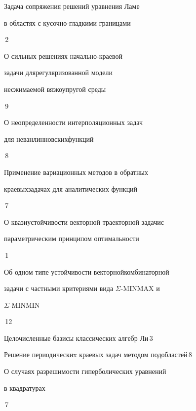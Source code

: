 

{Задача сопряжения решений уравнения Ламе 


в областях с кусочно-\newline гладкими границами}{\No\,2}




{О сильных решениях начально-краевой


задачи для\newline регуляризованной модели


несжимаемой вязкоупругой среды}{\No\,9}




{О неопределенности интерполяционных задач


для неванлинновских\newline функций}{\No\,8}







{Применение вариационных методов в обратных


краевых\newline задачах для аналитических функций}{\No\,7}




{О квазиустойчивости векторной траекторной задачи\newline с


параметрическим принципом оптимальности}{\No\,1}




{Об одном типе устойчивости векторной\newline комбинаторной


задачи с частными критериями вида $\Sigma$-MINMAX и


$\Sigma$-MINMIN}{\No\,12}




{Целочисленные базисы классических алгебр Ли}{\No\,3}




{Решение периодическиx краевых задач методом подобластей}{\No\,8}




{О случаях разрешимости гиперболических уравнений


в квадратурах}{\No\,7}





